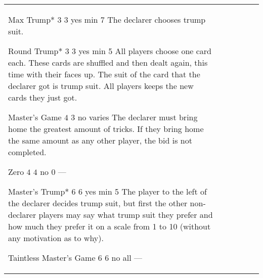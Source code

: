 \begin{table}
\begin{center}
\begin{tabularx}{\textwidth}{lcccc|X}
				\standardBidItem%
				{Max Trump*}
				{$3$}
				{$3$}
				{yes}
				{min 7}
				{%
					The declarer chooses trump suit.
				}

				\standardBidItem%
				{Round Trump*}
				{$3$}
				{$3$}
				{yes}
				{min 5}
				{%
					All players choose one card each. These cards are shuffled and then dealt again, this time with their faces up. The suit of the card that the declarer got is trump suit. All players keeps the new cards they just got.
				}

				\standardBidItem%
				{Master's Game}
				{$4$}
				{$3$}
				{no}
				{varies}
				{%
					The declarer must bring home the greatest amount of tricks. If they bring home the same amount as any other player, the bid is not completed. 
				}

				\standardBidItem%
				{Zero}
				{$4$}
				{$4$}
				{no}
				{0}
				{%
					---
				}

				\standardBidItem%
				{Master's Trump*}
				{$6$}
				{$6$}
				{yes}
				{min 5}
				{%
					The player to the left of the declarer decides trump suit, but first the other non-declarer players may say what trump suit they prefer and how much they prefer it on a scale from 1 to 10 (without any motivation as to why).
				}

				\standardBidItem%
				{Taintless Master's Game}
				{$6$}
				{$6$}
				{no}
				{all}
				{%
					---
				}
		\end{tabularx}
	\end{center}
\end{table}
